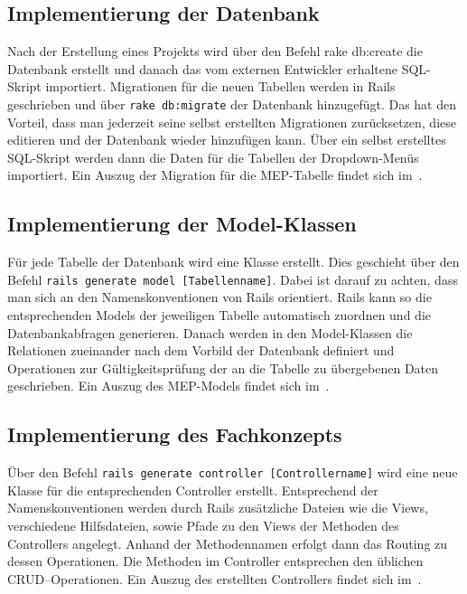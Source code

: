 \subsection{Implementierung der Datenbank}
\label{subsec:ImplementierungGeschäftslogik}
Nach der Erstellung eines Projekts wird über den Befehl rake db:create 
die Datenbank erstellt und danach das vom externen Entwickler erhaltene \acs{SQL}-Skript importiert. Migrationen für die neuen Tabellen werden in \acs{Rails} geschrieben und über \texttt{rake db:migrate} der Datenbank hinzugefügt. Das hat den Vorteil, dass man jederzeit seine selbst erstellten Migrationen zurücksetzen, diese editieren und der Datenbank wieder hinzufügen kann. Über ein selbst erstelltes \acs{SQL}-Skript werden dann die Daten für die Tabellen der Dropdown-Menüs importiert. Ein Auszug der Migration für die \ac{MEP}-Tabelle findet sich im~.

\subsection{Implementierung der Model-Klassen}
Für jede Tabelle der Datenbank wird eine Klasse erstellt. Dies geschieht über den Befehl \texttt{rails generate model [Tabellenname]}. Dabei ist darauf zu achten, dass man sich an den Namenskonventionen von \acs{Rails} orientiert. \acs{Rails} kann so die entsprechenden \acs{Model}s der jeweiligen Tabelle automatisch zuordnen und die Datenbankabfragen generieren. Danach werden in den \acs{Model}-Klassen die Relationen zueinander nach dem Vorbild der Datenbank definiert und Operationen zur Gültigkeitsprüfung der an die Tabelle zu übergebenen Daten geschrieben. Ein Auszug des \ac{MEP}-\acs{Model}s findet sich im~.

\subsection{Implementierung des Fachkonzepts}
Über den Befehl \texttt{rails generate controller [Controllername]} wird eine neue Klasse für die entsprechenden Controller erstellt. Entsprechend der Namenskonventionen werden durch \acs{Rails} zusätzliche Dateien wie die \acs{View}s, verschiedene Hilfsdateien, sowie Pfade zu den \acs{View}s der Methoden des \acs{Controller}s angelegt. Anhand der Methodennamen erfolgt dann das Routing zu dessen Operationen. Die Methoden im \acs{Controller} entsprechen den üblichen \acs{CRUD}–Operationen. Ein Auszug des erstellten \acs{Controller}s findet sich im~.

